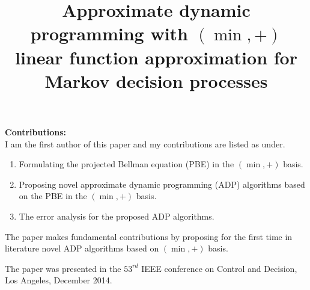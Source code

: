 \documentclass[8pt]{article}
\title{Approximate dynamic programming with $(\min, +)$ linear function approximation for Markov decision processes}
\author{}
\date{}
\begin{document}
\maketitle
\textbf{Contributions:\\}
I am the first author of this paper and my contributions are listed as under.
\begin{enumerate}
\item Formulating the projected Bellman equation (PBE) in the $(\min,+)$ basis.
\item Proposing novel approximate dynamic programming (ADP) algorithms based on the PBE in the $(\min,+)$ basis.
\item The error analysis for the proposed ADP algorithms.
\end{enumerate}
The paper makes fundamental contributions by proposing for the first time in literature novel ADP algorithms based on $(\min,+)$ basis.\par
The paper was presented in the $53^{rd}$ IEEE conference on Control and Decision, Los Angeles, December 2014.

\end{document}
